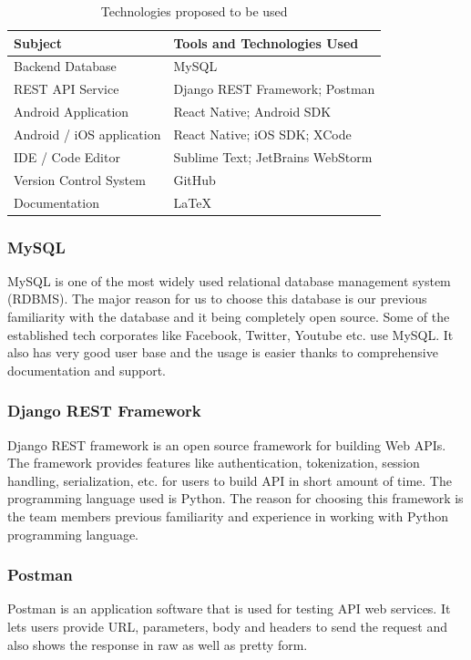 \documentclass[12pt, a4paper, oneside]{article}
\begin{document}
\renewcommand{\arraystretch}{1.5}
\begin{table}[H]
\begin{tabular}{|l|l|}
\hline
\rowcolor[HTML]{C0C0C0} 
\textbf{Subject}    & \textbf{Tools and Technologies Used} \\ \hline
Backend Database            & MySQL                        \\ \hline
REST API Service    & Django REST Framework; Postman        \\ \hline
Android Application  & React Native; Android SDK                 \\ \hline
Android / iOS application  & React Native; iOS SDK; XCode              \\ \hline
IDE / Code Editor& Sublime Text; JetBrains WebStorm  \\ \hline
Version Control System& GitHub  \\ \hline
Documentation & LaTeX \\ \hline
\end{tabular}
\caption{Technologies proposed to be used}
\label{table:tech}
\end{table}

\subsubsection{MySQL}
MySQL is one of the most widely used relational database management system (RDBMS). The major reason for us to choose this database is our previous familiarity with the database and it being completely open source. Some of the established tech corporates like Facebook, Twitter, Youtube etc. use MySQL. It also has very good user base and the usage is easier thanks to comprehensive documentation and support.

\subsubsection{Django REST Framework}
Django REST framework is an open source framework for building Web APIs. The framework provides features like authentication, tokenization, session handling, serialization, etc. for users to build API in short amount of time. The programming language used is Python. The reason for choosing this framework is the team members previous familiarity and experience in working with Python programming language.

\subsubsection{Postman}
Postman is an application software that is used for testing API web services. It lets users provide URL, parameters, body and headers to send the request and also shows the response in raw as well as pretty form.
\end{document}
